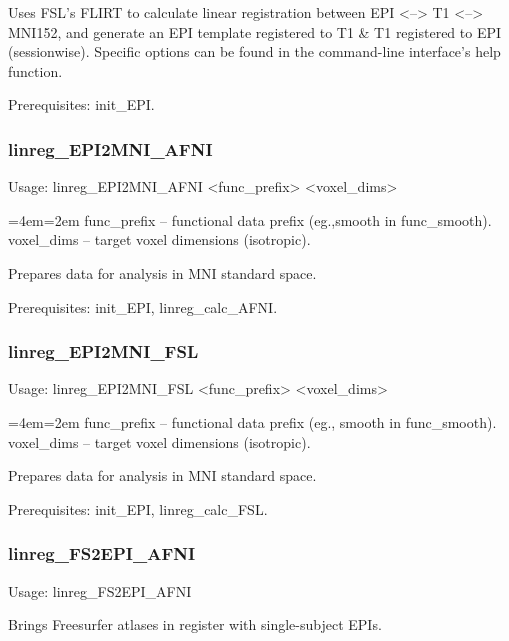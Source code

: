 \documentclass[final,titlepage,letterpaper,oneside,12pt]{article}
\renewcommand{\texttt}[2][BrickRed]{\textcolor{#1}{\ttfamily #2}}%
\newenvironment{blockquote}{%
  \par%
  \medskip
  \leftskip=4em\rightskip=2em%
  \noindent\ignorespaces}{%
  \par\medskip}
\begin{document}
\noindent Uses FSL's FLIRT to calculate linear registration between EPI <--> T1 <--> MNI152, and generate an EPI template registered to T1 \& T1 registered to EPI (sessionwise). Specific options can be found in the command-line interface's help function.

Prerequisites: \texttt{init\_EPI}.

\subsubsection{linreg\_EPI2MNI\_AFNI}
Usage: \texttt{linreg\_EPI2MNI\_AFNI <func\_prefix> <voxel\_dims>}

\begin{blockquote}
func\_prefix -- functional data prefix (eg.,smooth in func\_smooth). \\
voxel\_dims -- target voxel dimensions (isotropic). \
\end{blockquote}

\noindent Prepares data for analysis in MNI standard space.

Prerequisites: \texttt{init\_EPI}, \texttt{linreg\_calc\_AFNI}.

\subsubsection{linreg\_EPI2MNI\_FSL}
Usage: \texttt{linreg\_EPI2MNI\_FSL <func\_prefix> <voxel\_dims>}

\begin{blockquote}
func\_prefix -- functional data prefix (eg., smooth in func\_smooth). \\
voxel\_dims -- target voxel dimensions (isotropic). \
\end{blockquote}

\noindent Prepares data for analysis in MNI standard space.

Prerequisites: \texttt{init\_EPI}, \texttt{linreg\_calc\_FSL}.

\subsubsection{linreg\_FS2EPI\_AFNI}
Usage: \texttt{linreg\_FS2EPI\_AFNI}

\noindent Brings Freesurfer atlases in register with single-subject EPIs.
\end{document}
